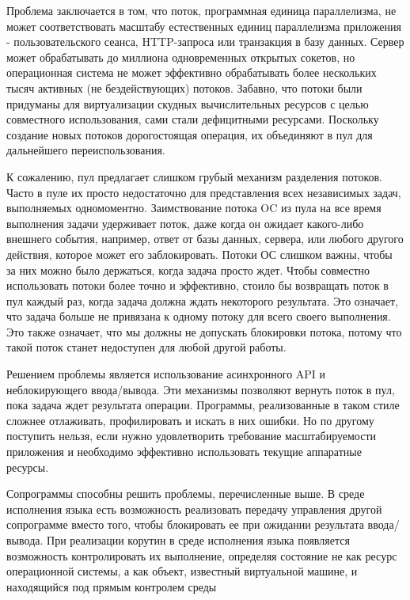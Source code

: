 	Проблема заключается в том, что поток, программная единица параллелизма, не может соответствовать масштабу
	естественных единиц параллелизма приложения - пользовательского сеанса, HTTP-запроса или транзакция в базу
	данных. Сервер может обрабатывать до миллиона одновременных открытых сокетов, но операционная система не
	может эффективно обрабатывать более нескольких тысяч активных (не бездействующих) потоков. 
	Забавно, что потоки были придуманы для виртуализации скудных вычислительных ресурсов с целью совместного
	использования, сами стали дефицитными ресурсами. Поскольку создание новых потоков дорогостоящая операция,
	их объединяют в пул для дальнейшего переиспользования. 
	
	К сожалению, пул предлагает слишком грубый механизм разделения потоков. Часто в пуле  их просто недостаточно
	для представления всех независимых задач, выполняемых одномоментно. Заимствование потока OC из
	пула на все время выполнения задачи удерживает поток, даже когда он ожидает какого-либо внешнего события,
	например, ответ от базы данных, сервера, или любого другого действия, которое может его заблокировать.
	Потоки ОС слишком важны, чтобы за них можно было держаться, когда задача просто ждет. Чтобы совместно
	использовать потоки более точно и эффективно, стоило бы возвращать поток в пул каждый раз, когда задача
	должна ждать некоторого результата. Это означает, что задача больше не привязана к одному потоку для всего
	своего выполнения. Это также означает, что мы должны не допускать блокировки потока, потому что такой
	поток станет недоступен для любой другой работы.
	\par
	Решением проблемы является использование асинхронного API и неблокирующего ввода/вывода. Эти  механизмы
	позволяют вернуть поток в пул, пока задача ждет результата операции. Программы, реализованные в таком
	стиле сложнее отлаживать, профилировать и искать в них ошибки. Но по другому поступить нельзя, если нужно
	удовлетворить требование масштабируемости приложения и необходимо эффективно использовать текущие
	аппаратные ресурсы. 
	\par
	Сопрограммы способны решить проблемы, перечисленные выше. В среде исполнения языка есть возможность реализовать
	передачу управления другой сопрограмме вместо того, чтобы блокировать ее при ожидании результата ввода/ вывода.
	При реализации корутин в среде исполнения языка появляется возможность контролировать их выполнение, определяя состояние 
	не как ресурс операционной системы, а как объект, известный виртуальной машине, и находящийся под прямым контролем среды
